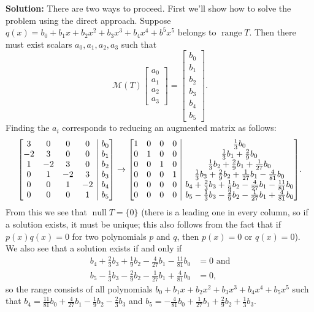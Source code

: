 \documentclass[letterpaper,12pt]{article}
\makeatletter
\DeclareMathOperator{\nul}{null}
\DeclareMathOperator{\range}{range}
\newcommand{\M}{\mathcal{M}}
\newenvironment{amatrix}[1]{%
  \left[\begin{array}{@{}*{#1}{c}|c@{}}
}{%
  \end{array}\right]
}
\makeatother
\begin{document}
\begin{enumerate}
\begin{enumerate}
{\bf Solution:} There are two ways to proceed. First we'll show how to solve the problem using the direct approach. Suppose $q(x) = b_0+b_1x+b_2x^2+b_3x^3+b_4x^4+b^5x^5$ belongs to $\range T$. Then there must exist scalars $a_0,a_1,a_2,a_3$ such that
\[
 \M(T)\begin{bmatrix}a_0\\a_1\\a_2\\a_3\end{bmatrix} = \begin{bmatrix}b_0\\b_1\\b_2\\b_3\\b_4\\b_5\end{bmatrix}.
\]
Finding the $a_i$ corresponds to reducing an augmented matrix as follows:
\[
 \begin{amatrix}{4}
3&0&0&0&b_0\\
-2&3&0&0&b_1\\
1&-2&3&0&b_2\\
0&1&-2&3&b_3\\
0&0&1&-2&b_4\\
0&0&0&1&b_5\\  
 \end{amatrix}\to
\begin{amatrix}{4}
 1&0&0&0&\frac{1}{3}b_0\\
 0&1&0&0&\frac{1}{3}b_1+\frac{2}{9}b_0\\
 0&0&1&0&\frac{1}{3}b_2+\frac{2}{9}b_1+\frac{1}{27}b_0\\
 0&0&0&1&\frac{1}{3}b_3+\frac{2}{9}b_2+\frac{1}{27}b_1-\frac{4}{81}b_0\\
 0&0&0&0&b_4+\frac{2}{3}b_3+\frac{1}{9}b_2-\frac{4}{27}b_1-\frac{11}{81}b_0\\
 0&0&0&0&b_5-\frac{1}{3}b_3-\frac{2}{9}b_2-\frac{1}{27}b_1+\frac{4}{81}b_0
\end{amatrix}.
\]
From this we see that $\nul T = \{0\}$ (there is a leading one in every column, so if a solution exists, it must be unique; this also follows from the fact that if $p(x)q(x)=0$ for two polynomials $p$ and $q$, then $p(x)=0$ or $q(x)=0$). We also see that a solution exists if and only if
\begin{align*}
 b_4+\frac{2}{3}b_3+\frac{1}{9}b_2-\frac{4}{27}b_1-\frac{11}{81}b_0 & = 0 \text{ and}\\
 b_5-\frac{1}{3}b_3-\frac{2}{9}b_2-\frac{1}{27}b_1+\frac{4}{81}b_0 & = 0,
\end{align*}
so the range consists of all polynomials $b_0+b_1x+b_2x^2+b_3x^3+b_4x^4+b_5x^5$ such that $b_4 = \frac{11}{81}b_0+\frac{4}{27}b_1-\frac{1}{9}b_2-\frac{2}{3}b_3$ and $b_5 = -\frac{4}{81}b_0+\frac{1}{27}b_1+\frac{2}{9}b_2+\frac{1}{3}b_3$.


\end{enumerate}
\end{enumerate}
\end{document}
